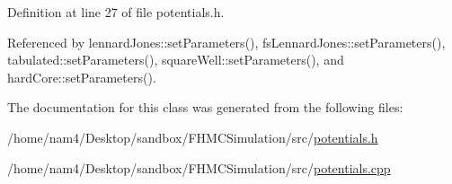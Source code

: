Definition at line 27 of file potentials.\-h.



Referenced by lennard\-Jones\-::set\-Parameters(), fs\-Lennard\-Jones\-::set\-Parameters(), tabulated\-::set\-Parameters(), square\-Well\-::set\-Parameters(), and hard\-Core\-::set\-Parameters().



The documentation for this class was generated from the following files\-:\begin{DoxyCompactItemize}
\item 
/home/nam4/\-Desktop/sandbox/\-F\-H\-M\-C\-Simulation/src/\hyperlink{potentials_8h}{potentials.\-h}\item 
/home/nam4/\-Desktop/sandbox/\-F\-H\-M\-C\-Simulation/src/\hyperlink{potentials_8cpp}{potentials.\-cpp}\end{DoxyCompactItemize}
